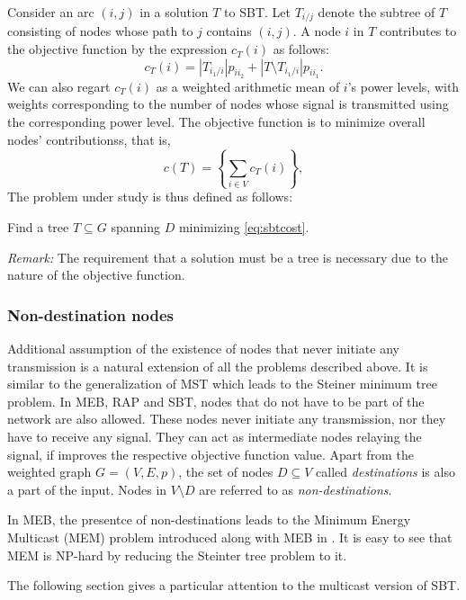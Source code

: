 Consider an arc $(i,j)$ in a solution $T$ to SBT.
Let $T_{i/j}$ denote the subtree of $T$ consisting of nodes whose path to $j$ contains $(i,j)$. 
A node $i$ in $T$ contributes to the objective function by the expression $c_T(i)$ as follows:
\begin{equation}
c_T(i)=|T_{i_1/i}|p_{ii_2} + |T\setminus T_{i_1/i}|p_{ii_1}.
\end{equation}
We can also regart $c_T(i)$ as a weighted arithmetic mean of $i$'s power levels, with weights corresponding to the number of nodes whose signal is transmitted using the corresponding power level.
The objective function is to minimize overall nodes' contributionss, that is,
\begin{equation}
c(T)=\left\{\sum\limits_{i\in V}c_T(i) \right\},
\label{eq:sbtcost}
\end{equation}
The problem under study is thus defined as follows:
\begin{problem}
Find a tree $T\subseteq G$ spanning $D$ minimizing \eqref{eq:sbtcost}.
\end{problem}



\emph{Remark:} The requirement that a solution must be a tree is necessary due to the nature of the objective function.
\subsubsection{Non-destination nodes}

Additional assumption of the existence of nodes that never initiate any transmission is a natural extension of all the problems described above.
It is similar to the generalization of MST which leads to the Steiner minimum tree problem.
In MEB, RAP and SBT, nodes that do not have to be part of the network are also allowed. 
These nodes never initiate any transmission, nor they have to receive any signal.
They can act as intermediate nodes relaying the signal, if improves the respective objective function value.
Apart from the weighted graph $G=(V,E,p)$, the set of nodes $D\subseteq V$ called \emph{destinations} is also a part of the input.
Nodes in $V\setminus D$ are referred to as \emph{non-destinations}.

In MEB, the presentce of non-destinations leads to the Minimum Energy Multicast (MEM) problem introduced along with MEB in \cite{wieselthier00}.
It is easy to see that MEM is NP-hard by reducing the Steinter tree problem to it.


The following section gives a particular attention to the multicast version of SBT.

